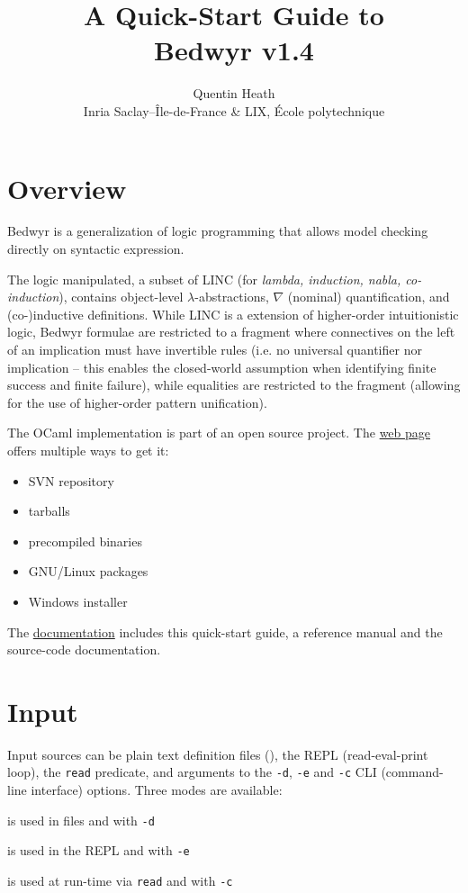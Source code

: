 \documentclass[a4paper,twocolumn]{article}
\title{{\Huge A Quick-Start Guide to\\Bedwyr v1.4}}
\author{Quentin Heath\\
        Inria Saclay--\^Ile-de-France \& LIX, \'Ecole polytechnique}
\begin{document}
\maketitle

\section{Overview}

Bedwyr is a generalization of logic programming that allows model
checking directly on syntactic expression.

The logic manipulated, a subset of LINC (for \emph{lambda, induction,
nabla, co-induction}), contains object-level $\lambda$-abstractions,
$\nabla$ (nominal) quantification, and (co-)inductive definitions.
While LINC is a extension of higher-order intuitionistic logic, Bedwyr
formulae are restricted to a fragment where connectives on the left of
an implication must have invertible rules (i.e. no universal
quantifier nor implication -- this enables the closed-world assumption
when identifying finite success and finite failure), while equalities
are restricted to the \Ll{} fragment (allowing for the use of
higher-order pattern unification).

The OCaml implementation is part of an open source project.  The
\href{http://slimmer.gforge.inria.fr/bedwyr/#download}{web page}
offers multiple ways to get it:
\begin{itemize}[nolistsep]
  \item SVN repository
  \item tarballs
  \item precompiled binaries
  \item GNU/Linux packages
  \item Windows installer
\end{itemize}

The
\href{http://slimmer.gforge.inria.fr/bedwyr/#documentation}{documentation}
includes this quick-start guide, a reference manual and the
source-code documentation.

\section{Input}

Input sources can be plain text definition files (), the
REPL (read-eval-print loop), the \lstinline+read+ predicate, and
arguments to the \texttt{-d}, \texttt{-e} and \texttt{-c} CLI
(command-line interface) options.  Three modes are available:
\begin{description}[nolistsep]
  \item[definition mode] is used in  files and with
    \texttt{-d}
  \item[toplevel mode] is used in the REPL and with \texttt{-e}
  \item[term mode] is used at run-time via \lstinline+read+ and with
    \texttt{-c}
\end{description}
\end{document}
